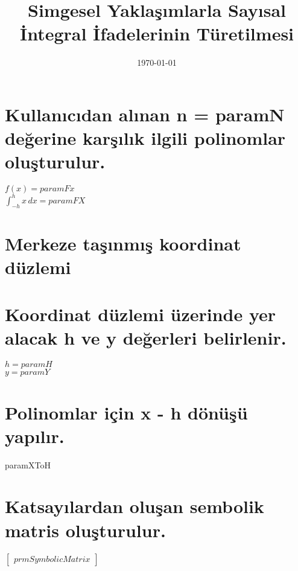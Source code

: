 \documentclass{article}
\begin{document}
\title{Simgesel Yaklaşımlarla Sayısal İntegral İfadelerinin Türetilmesi}
\date{\today}
\maketitle

\section{Kullanıcıdan alınan n = paramN değerine karşılık ilgili polinomlar oluşturulur.}
$f(x) = paramFx$\\
$\int_{-h}^{h}x\,dx = paramFX$

\section{Merkeze taşınmış koordinat düzlemi}
\begin{center}
\end{center}

\section{Koordinat düzlemi üzerinde yer alacak h ve y değerleri belirlenir.}
$h = paramH$\\
$y = paramY$

\section{Polinomlar için x - h dönüşü yapılır.}
paramXToH


\section{Katsayılardan oluşan sembolik matris oluşturulur.}
\begin{center}
$\begin{bmatrix}
prmSymbolicMatrix
\end{bmatrix} $
\end{center}
\end{document}
